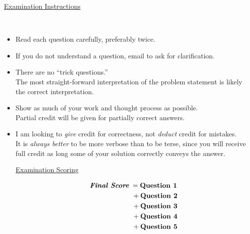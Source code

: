\documentclass{ExamCUNY}
\newcommand{\?}{\stackrel{?}{=}}
\begin{document}
\clearpage%
%
\begin{center}
{\Huge \underline{Examination Instructions}}
\end{center}
~\vspace*{5mm}
{\Large
\begin{itemize}
\item Read each question carefully, preferably twice.
\item If you do not understand a question, email to ask for clarification.
\item There are no ``trick questions.''\\
The most straight-forward interpretation of the problem statement is likely the correct interpretation.
\item Show as much of your work and thought process as possible.\\
Partial credit will be given for partially correct answers.
\item I am looking to \emph{give} credit for correctness, not \emph{deduct} credit for mistakes.\\
It is \emph{always better} to be more verbose than to be terse, since you will receive full credit as long some of your solution correctly conveys the answer.
\vspace*{5cm}
\begin{center}
{\Huge \underline{Examination Scoring}}
\end{center}
\begin{align*}
\textit{\textbf{Final Score}}\; &= \textbf{Question 1}\\
&\,+ \textbf{Question 2}\\
&\,+ \textbf{Question 3}\\
&\,+ \textbf{Question 4}\\
&\,+ \textbf{Question 5}
\end{align*}
\end{itemize}
}



\newcommand{\ExamObject}[2]{%
{\Large \underline{\textbf{|~#1}}}\\[5mm]%
{\Large #2}\\[5mm]%
}

\clearpage%


\vfill
\end{document}
